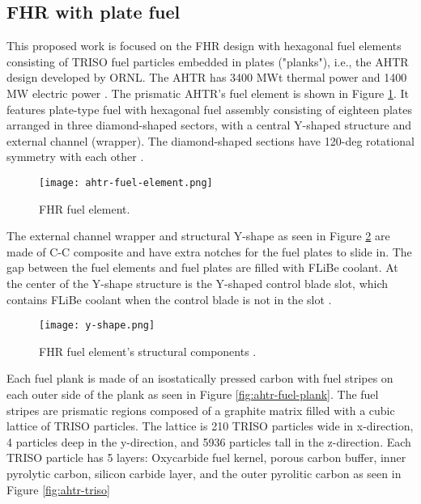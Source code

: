 \subsection{FHR with plate fuel} %

This proposed work is focused on the FHR design with hexagonal fuel elements 
consisting of \gls{TRISO} fuel particles embedded in plates ("planks"), i.e., the 
\gls{AHTR} design developed by ORNL. 
The \gls{AHTR} has 3400 MWt thermal power and 1400 MW electric power 
\cite{varma_ahtr_2012}. 
The prismatic \gls{AHTR}'s fuel element is shown in Figure \ref{fig:ahtr-fuel-element}.  
It features plate-type fuel with hexagonal fuel assembly consisting of eighteen plates 
arranged in three diamond-shaped sectors, with a central Y-shaped structure 
and external channel (wrapper).
The diamond-shaped sections have 120-deg rotational symmetry with each other 
\cite{varma_ahtr_2012,ramey_monte_2018,noauthor_fluoride_nodate}. 

\begin{figure}[]
    \centering
    \texttt{[image: ahtr-fuel-element.png]} 
    \caption{FHR fuel element.}
    \label{fig:ahtr-fuel-element}
\end{figure}

The external channel wrapper and structural Y-shape as seen in Figure 
\ref{fig:y-shape} are made of C-C composite and have extra notches for the 
fuel plates to slide in. 
The gap between the fuel elements and fuel plates are filled with \gls{FLiBe}
coolant. 
At the center of the Y-shape structure is the Y-shaped control blade slot, 
which contains \gls{FLiBe} coolant when the control blade is not in the slot
\cite{varma_ahtr_2012,ramey_monte_2018,noauthor_fluoride_nodate}.

\begin{figure}[]
    \centering
    \texttt{[image: y-shape.png]} 
    \caption{FHR fuel element's structural components \cite{noauthor_fluoride_nodate}.}
    \label{fig:y-shape}
\end{figure}

Each fuel plank is made of an isostatically pressed carbon with fuel stripes 
on each outer side of the plank as seen in Figure \ref{fig:ahtr-fuel-plank}. 
The fuel stripes are prismatic regions composed of a graphite matrix filled with 
a cubic lattice of \gls{TRISO} particles. 
The lattice is 210 \gls{TRISO} particles wide in x-direction, 4 particles deep in 
the y-direction, and 5936 particles tall in the z-direction. 
Each \gls{TRISO} particle has 5 layers: Oxycarbide fuel kernel, porous carbon 
buffer, inner pyrolytic carbon, silicon carbide layer, and the outer pyrolitic 
carbon as seen in Figure \ref{fig:ahtr-triso}

